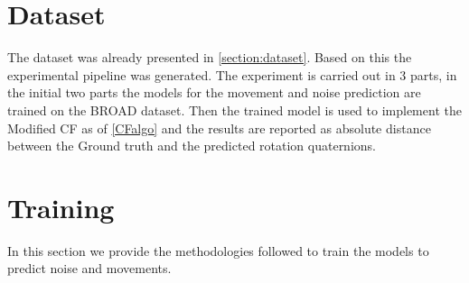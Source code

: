 \documentclass{iutbscthesis}
\begin{document}
\section{Dataset}
The dataset was already presented in \autoref{section:dataset}. Based on this the experimental pipeline was generated. The experiment is carried out in 3 parts, in the initial two parts the models for the movement and noise prediction are trained on the BROAD\cite{BROAD} dataset. Then the trained model is used to implement the Modified CF as of \autoref{CFalgo} and the results are reported as absolute distance between the Ground truth and the predicted rotation quaternions\cite{absoluteDistance}.


\section{Training}
In this section we provide the methodologies followed to train the models to predict noise and movements.
\end{document}
